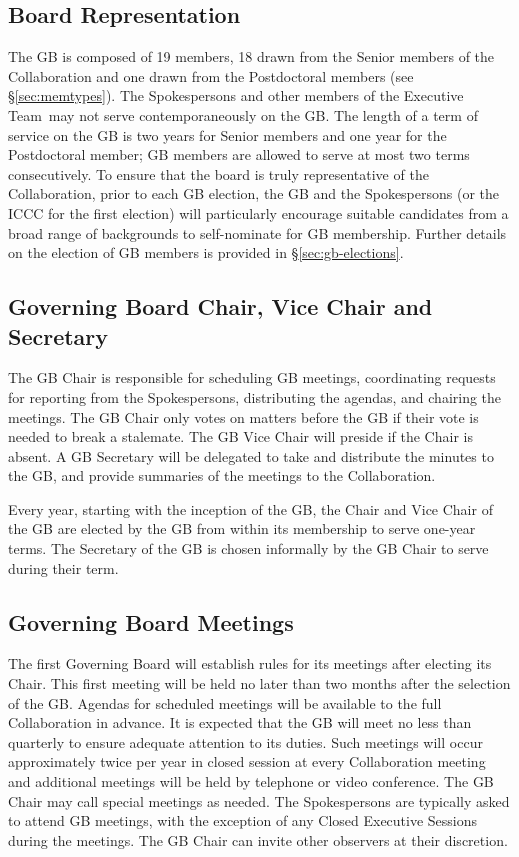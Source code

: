 \documentclass[12pt]{article}
\newcommand{\exec}{{Executive Team}}
\begin{document}
\subsection{Board Representation}

The GB is composed of 19 members, 18 drawn from the Senior members of the Collaboration and one drawn from the Postdoctoral members (see \S\ref{sec:memtypes}). The Spokespersons and other members of the \exec\ may not serve contemporaneously on the GB. The length of a term of service on the GB is two years for Senior members and one year for the Postdoctoral member; GB members are allowed to serve at most two terms consecutively. To ensure that the board is truly representative of the Collaboration, prior to each GB election,  the GB and the Spokespersons (or the ICCC for the first election) will particularly encourage suitable candidates from a broad range of backgrounds to self-nominate  for GB membership.  Further details on the election of GB members is provided in  \S\ref{sec:gb-elections}.

\subsection{Governing Board Chair, Vice Chair and Secretary}

The GB Chair is responsible for scheduling GB meetings, coordinating requests for reporting from the Spokespersons, distributing the agendas, and chairing the meetings.  The GB Chair only votes on matters before the GB if their vote is needed to break a stalemate.  The GB Vice Chair will preside if the Chair is absent. A GB Secretary will be delegated to take and distribute the minutes to the GB, and provide summaries of the meetings to the Collaboration.

Every year, starting with the inception of the GB, the Chair and Vice Chair of the GB are elected by the GB from within its membership to serve one-year terms. The Secretary of the GB is chosen informally by the GB Chair to serve during their term.

\subsection{Governing Board Meetings}

The first Governing Board will establish rules for its meetings after electing its Chair. This first meeting will be held no later than two months after the selection of the GB.  Agendas for scheduled meetings will be available to the full Collaboration in advance.  It is expected that the GB will meet no less than quarterly to ensure adequate attention to its duties. Such meetings will occur approximately twice per year in closed session at every Collaboration meeting and additional meetings will be held by telephone or video conference. The GB Chair may call special meetings as needed. The Spokespersons are typically asked to attend GB meetings, with the exception of any Closed Executive Sessions during the meetings.  The GB Chair can invite other observers at their discretion.
\end{document}
